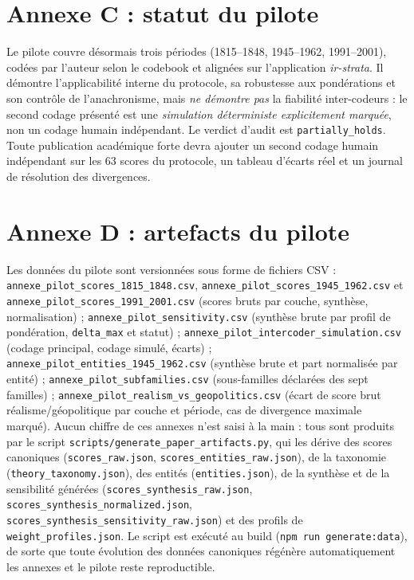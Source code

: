 \documentclass[11pt,a4paper]{article}
\begin{document}
\section{Annexe C : statut du pilote}

Le pilote couvre désormais trois périodes (1815--1848, 1945--1962, 1991--2001), codées par l'auteur selon le codebook et alignées sur l'application \emph{ir-strata}. Il démontre l'applicabilité interne du protocole, sa robustesse aux pondérations et son contrôle de l'anachronisme, mais \emph{ne démontre pas} la fiabilité inter-codeurs : le second codage présenté est une \emph{simulation déterministe explicitement marquée}, non un codage humain indépendant. Le verdict d'audit est \texttt{partially\_holds}. Toute publication académique forte devra ajouter un second codage humain indépendant sur les 63 scores du protocole, un tableau d'écarts réel et un journal de résolution des divergences.

\section{Annexe D : artefacts du pilote}

Les données du pilote sont versionnées sous forme de fichiers CSV : \texttt{annexe\_pilot\_scores\_1815\_1848.csv}, \texttt{annexe\_pilot\_scores\_1945\_1962.csv} et \texttt{annexe\_pilot\_scores\_1991\_2001.csv} (scores bruts par couche, synthèse, normalisation) ; \texttt{annexe\_pilot\_sensitivity.csv} (synthèse brute par profil de pondération, \texttt{delta\_max} et statut) ; \texttt{annexe\_pilot\_intercoder\_simulation.csv} (codage principal, codage simulé, écarts) ; \texttt{annexe\_pilot\_entities\_1945\_1962.csv} (synthèse brute et part normalisée par entité) ; \texttt{annexe\_pilot\_subfamilies.csv} (sous-familles déclarées des sept familles) ; \texttt{annexe\_pilot\_realism\_vs\_geopolitics.csv} (écart de score brut réalisme/géopolitique par couche et période, cas de divergence maximale marqué). Aucun chiffre de ces annexes n'est saisi à la main : tous sont produits par le script \texttt{scripts/generate\_paper\_artifacts.py}, qui les dérive des scores canoniques (\texttt{scores\_raw.json}, \texttt{scores\_entities\_raw.json}), de la taxonomie (\texttt{theory\_taxonomy.json}), des entités (\texttt{entities.json}), de la synthèse et de la sensibilité générées (\texttt{scores\_synthesis\_raw.json}, \texttt{scores\_synthesis\_normalized.json}, \texttt{scores\_synthesis\_sensitivity\_raw.json}) et des profils de \texttt{weight\_profiles.json}. Le script est exécuté au build (\texttt{npm run generate:data}), de sorte que toute évolution des données canoniques régénère automatiquement les annexes et le pilote reste reproductible.
\end{document}
